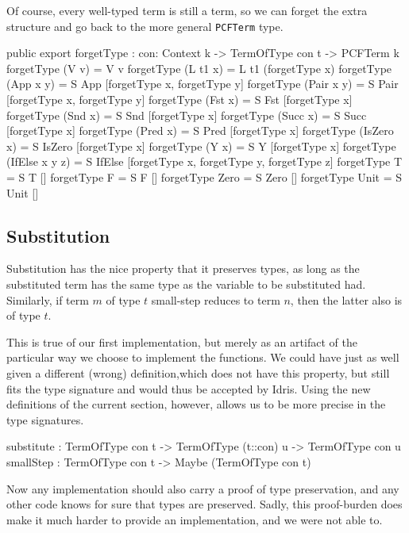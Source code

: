 Of course, every well-typed term is still a term, so we can forget the extra structure and go back
to the more general \texttt{PCFTerm} type.
\begin{code}
public export
forgetType : {con: Context k} -> TermOfType con t -> PCFTerm k
forgetType (V v)      = V v
forgetType (L t1 x)   = L t1 (forgetType x)
forgetType (App x y)  = S App   [forgetType x, forgetType y]
forgetType (Pair x y) = S Pair  [forgetType x, forgetType y]
forgetType (Fst x)    = S Fst   [forgetType x]
forgetType (Snd x)    = S Snd   [forgetType x]
forgetType (Succ x)   = S Succ  [forgetType x]
forgetType (Pred x)   = S Pred  [forgetType x]
forgetType (IsZero x) = S IsZero [forgetType x]
forgetType (Y x)      = S Y     [forgetType x]
forgetType (IfElse x y z) = S IfElse [forgetType x, forgetType y, forgetType z]
forgetType T          = S T []
forgetType F          = S F []
forgetType Zero       = S Zero []
forgetType Unit       = S Unit []
\end{code}

\subsection{Substitution}
Substitution has the nice property that it preserves types, as long as the substituted term has 
the same type as the variable to be substituted had. Similarly, if term $m$ of type $t$
small-step reduces to term $n$, then the latter also is of type $t$.

This is true of our first implementation, but merely as an artifact of the particular way we choose to implement the functions. We could have just as well given a different (wrong) definition,which does not have this property, but still fits the type signature and would thus be accepted by Idris.
Using the new definitions of the current section, however, allows us to be more precise in the type signatures.
\begin{code}
substitute : TermOfType con t -> TermOfType (t::con) u -> TermOfType con u
smallStep  : TermOfType con t -> Maybe (TermOfType con t)
\end{code}

Now any implementation should also carry a proof of type preservation, and any other code knows for sure that types are preserved.
Sadly, this proof-burden does make it much harder to provide an implementation, and we were not able to.